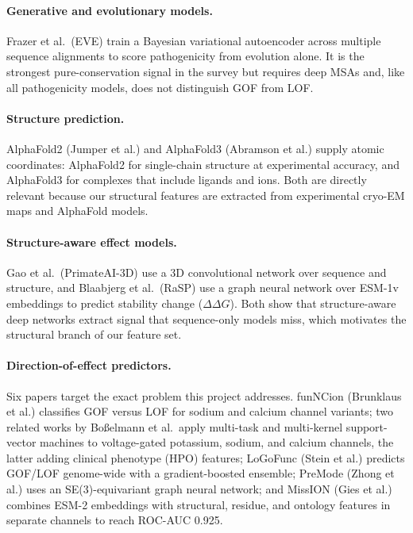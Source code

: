 \documentclass[11pt]{article}
\begin{document}
\paragraph{Generative and evolutionary models.}
Frazer et al.\ (EVE) train a Bayesian variational autoencoder across multiple
sequence alignments to score pathogenicity from evolution alone. It is the
strongest pure-conservation signal in the survey but requires deep MSAs and,
like all pathogenicity models, does not distinguish GOF from LOF.

\paragraph{Structure prediction.}
AlphaFold2 (Jumper et al.) and AlphaFold3 (Abramson et al.) supply atomic
coordinates: AlphaFold2 for single-chain structure at experimental accuracy, and
AlphaFold3 for complexes that include ligands and ions. Both are directly
relevant because our structural features are extracted from experimental cryo-EM
maps and AlphaFold models.

\paragraph{Structure-aware effect models.}
Gao et al.\ (PrimateAI-3D) use a 3D convolutional network over sequence and
structure, and Blaabjerg et al.\ (RaSP) use a graph neural network over ESM-1v
embeddings to predict stability change ($\Delta\Delta G$). Both show that
structure-aware deep networks extract signal that sequence-only models miss,
which motivates the structural branch of our feature set.

\paragraph{Direction-of-effect predictors.}
Six papers target the exact problem this project addresses. funNCion
(Brunklaus et al.) classifies GOF versus LOF for sodium and calcium channel
variants; two related works by Bo{\ss}elmann et al.\ apply multi-task and
multi-kernel support-vector machines to voltage-gated potassium, sodium, and
calcium channels, the latter adding clinical phenotype (HPO) features; LoGoFunc
(Stein et al.) predicts GOF/LOF genome-wide with a gradient-boosted ensemble;
PreMode (Zhong et al.) uses an SE(3)-equivariant graph neural network; and
MissION (Gies et al.) combines ESM-2 embeddings with structural, residue, and
ontology features in separate channels to reach ROC-AUC 0.925.
\end{document}
